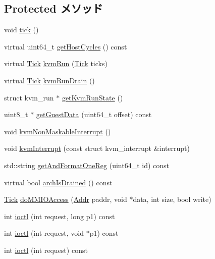 \subsection*{Protected メソッド}
\begin{DoxyCompactItemize}
\item 
void \hyperlink{classBaseKvmCPU_a873dd91783f9efb4a590aded1f70d6b0}{tick} ()
\item 
virtual uint64\_\-t \hyperlink{classBaseKvmCPU_abcad2a22057ba48360b17b978f694b48}{getHostCycles} () const 
\item 
virtual \hyperlink{base_2types_8hh_a5c8ed81b7d238c9083e1037ba6d61643}{Tick} \hyperlink{classBaseKvmCPU_aed3dbd0c0bf26d82ee56367a3f350506}{kvmRun} (\hyperlink{base_2types_8hh_a5c8ed81b7d238c9083e1037ba6d61643}{Tick} ticks)
\item 
virtual \hyperlink{base_2types_8hh_a5c8ed81b7d238c9083e1037ba6d61643}{Tick} \hyperlink{classBaseKvmCPU_a405afc17ad0dee3b816012ce909b2b6f}{kvmRunDrain} ()
\item 
struct kvm\_\-run $\ast$ \hyperlink{classBaseKvmCPU_ae544593d8bd3763ec6cf4cc7d0fd614b}{getKvmRunState} ()
\item 
uint8\_\-t $\ast$ \hyperlink{classBaseKvmCPU_a0e5c1a55b7cce45487f5778ee272acdf}{getGuestData} (uint64\_\-t offset) const 
\item 
void \hyperlink{group__KvmInterrupts_gabc700469cba2d4bba666902e552e7c2e}{kvmNonMaskableInterrupt} ()
\item 
void \hyperlink{group__KvmInterrupts_ga16b8f95e3f70098952604e6b8a121679}{kvmInterrupt} (const struct kvm\_\-interrupt \&interrupt)
\item 
std::string \hyperlink{classBaseKvmCPU_af080be5963a74cfafcfc1db16f294f1a}{getAndFormatOneReg} (uint64\_\-t id) const 
\item 
virtual bool \hyperlink{classBaseKvmCPU_a4ee4cbdc5d3315fd8016b44d3e77abd5}{archIsDrained} () const 
\item 
\hyperlink{base_2types_8hh_a5c8ed81b7d238c9083e1037ba6d61643}{Tick} \hyperlink{classBaseKvmCPU_a1a68601eed760a2ebbe974e685901b60}{doMMIOAccess} (\hyperlink{base_2types_8hh_af1bb03d6a4ee096394a6749f0a169232}{Addr} paddr, void $\ast$data, int size, bool write)
\item 
int \hyperlink{group__KvmIoctl_ga106fe09b5e87d6c14884f8ffff7b338a}{ioctl} (int request, long p1) const 
\item 
int \hyperlink{group__KvmIoctl_ga89db87cb31fe2ba732de8fa68c8bd1f1}{ioctl} (int request, void $\ast$p1) const 
\item 
int \hyperlink{group__KvmIoctl_ga32cd3b0742689c29c9ab9e3e03feb5f2}{ioctl} (int request) const 
\end{DoxyCompactItemize}
